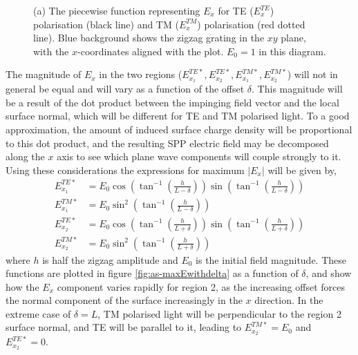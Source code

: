 \begin{figure}
\begin{center}

\end{center}
\caption[The piecewise function representing $E_x$ for TE ($E_x^{TE}$) polarisation and TM ($E_x^{TM}$) polarisation.]{(a) The piecewise function representing $E_x$ for TE ($E_x^{TE}$) polarisation (black line) and TM ($E_x^{TM}$) polarisation (red dotted line). Blue background shows the zigzag grating in the $xy$ plane, with the $x$-coordinates aligned with the plot. $E_0=1$ in this diagram.\label{fig:as-piecewisefuncs}}
\end{figure}

The magnitude of $E_x$ in the two regions ($E_{x_1}^{TE*},E_{x_2}^{TE*},E_{x_1}^{TM*},E_{x_2}^{TM*}$) will not in general be equal and will vary as a function of the offset $\delta$. This magnitude will be a result of the dot product between the impinging field vector and the local surface normal, which will be different for TE and TM polarised light. To a good approximation, the amount of induced surface charge density will be proportional to this dot product, and the resulting SPP electric field  may be decomposed along the $x$ axis to see which plane wave components will couple strongly to it. Using these considerations the expressions for maximum $|E_x|$ will be given by,
\begin{align}
E_{x_1}^{TE*}&=E_0 \cos \left( \tan^{-1}\left( \frac{h}{L-\delta}\right)\right) \sin \left( \tan^{-1}\left( \frac{h}{L-\delta}\right)\right)\\
E_{x_1}^{TM*}&=E_0 \sin^2 \left( \tan^{-1}\left( \frac{h}{L-\delta}\right)\right)\\
E_{x_2}^{TE*}&=E_0 \cos \left( \tan^{-1}\left( \frac{h}{L+\delta}\right)\right) \sin \left( \tan^{-1}\left( \frac{h}{L+\delta}\right)\right)\\
E_{x_2}^{TM*}&=E_0 \sin^2 \left( \tan^{-1}\left( \frac{h}{L+\delta}\right)\right)
\end{align}
where $h$ is half the zigzag amplitude and $E_0$ is the initial field magnitude. These functions are plotted in figure \ref{fig:as-maxEwithdelta} as a function of $\delta$, and show how the $E_x$ component varies rapidly for region 2, as the increasing offset forces the normal component of the surface increasingly in the $x$ direction. In the extreme case of $\delta=L$, TM polarised light will be perpendicular to the region 2 surface normal, and TE will be parallel to it, leading to $E_{x_2}^{TM*}=E_0$ and $E_{x_2}^{TE*}=0$.

